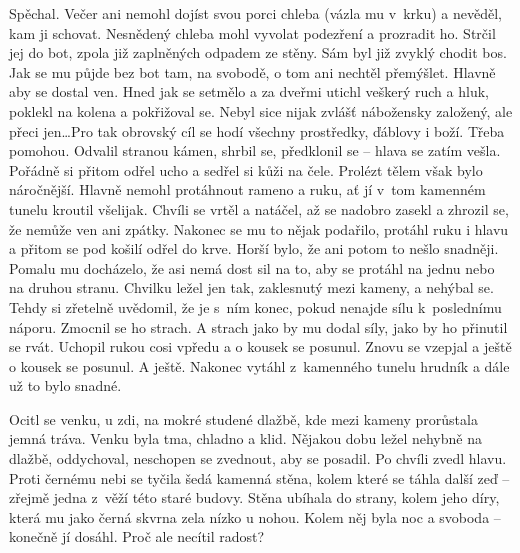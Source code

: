 Spěchal. Večer ani nemohl dojíst svou porci chleba (vázla mu v krku) a nevěděl, kam ji schovat. Nesnědený chleba mohl vyvolat podezření a prozradit ho. Strčil jej do bot, zpola již zaplněných odpadem ze stěny. Sám byl již zvyklý chodit bos. Jak se mu půjde bez bot tam, na svobodě, o tom ani nechtěl přemýšlet. Hlavně aby se dostal ven. Hned jak se setmělo a za dveřmi utichl veškerý ruch a hluk, poklekl na kolena a pokřižoval se. Nebyl sice nijak zvlášť nábožensky založený, ale přeci jen\ldots Pro tak obrovský cíl se hodí všechny prostředky, ďáblovy i boží. Třeba pomohou. Odvalil stranou kámen, shrbil se, předklonil se -- hlava se zatím vešla. Pořádně si přitom odřel ucho a sedřel si kůži na čele. Prolézt tělem však bylo náročnější. Hlavně nemohl protáhnout rameno a ruku, ať jí v tom kamenném tunelu kroutil všelijak. Chvíli se vrtěl a natáčel, až se nadobro zasekl a zhrozil se, že nemůže ven ani zpátky. Nakonec se mu to nějak podařilo, protáhl ruku i hlavu a přitom se pod košilí odřel do krve. Horší bylo, že ani potom to nešlo snadněji. Pomalu mu docházelo, že asi nemá dost sil na to, aby se protáhl na jednu nebo na druhou stranu. Chvilku ležel jen tak, zaklesnutý mezi kameny, a nehýbal se. Tehdy si zřetelně uvědomil, že je s ním konec, pokud nenajde sílu k poslednímu náporu. Zmocnil se ho strach. A strach jako by mu dodal síly, jako by ho přinutil se rvát. Uchopil rukou cosi vpředu a o kousek se posunul. Znovu se vzepjal a ještě o kousek se posunul. A ještě. Nakonec vytáhl z kamenného tunelu hrudník a dále už to bylo snadné.

Ocitl se venku, u zdi, na mokré studené dlažbě, kde mezi kameny prorůstala jemná tráva.
Venku byla tma, chladno a klid. Nějakou dobu ležel nehybně na dlažbě, oddychoval, neschopen se zvednout, aby se posadil. Po chvíli zvedl hlavu. Proti černému nebi se tyčila šedá kamenná stěna, kolem které se táhla další zeď -- zřejmě jedna z věží této staré budovy. Stěna ubíhala do strany, kolem jeho díry, která mu jako černá skvrna zela nízko u nohou. Kolem něj byla noc a svoboda -- konečně jí dosáhl. Proč ale necítil radost?

